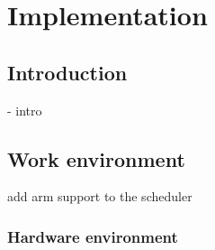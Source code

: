 

\chapter{Implementation}


\section{Introduction}
- intro

\section{Work environment}
add arm support to the scheduler
    \subsection{Hardware environment}






